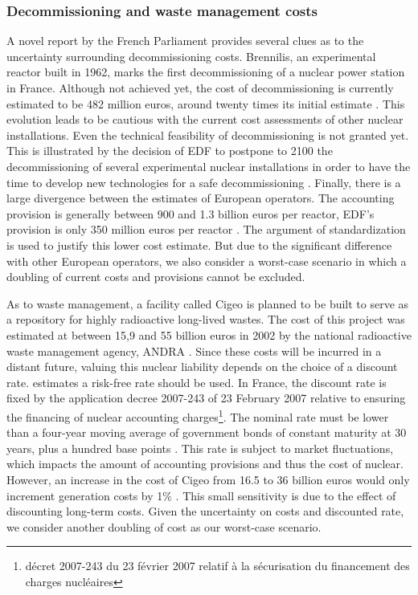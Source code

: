 \subsubsection{Decommissioning and waste management costs}

A novel report by the French Parliament provides several clues as to the uncertainty surrounding decommissioning costs. 
Brennilis, an experimental reactor built in 1962, marks the first decommissioning of a nuclear power station in France. Although not achieved yet, the cost of decommissioning is currently estimated to be 482 million euros, around twenty times its initial estimate \citep{AN2017}.
This evolution leads to be cautious with the current cost assessments of other nuclear installations.
Even the technical feasibility of decommissioning is not granted yet. This is illustrated by the decision of EDF to postpone to 2100 the decommissioning of several experimental nuclear installations in order to have the time to develop new technologies for a safe decommissioning \citep{AN2017}.
Finally, there is a large divergence between the estimates of European operators. The accounting provision is generally between 900 and 1.3 billion euros per reactor, EDF's provision is only 350 million euros per reactor \citep{AN2017}. The argument of standardization is used to justify this lower cost estimate.
But due to the significant difference with other European operators, we also consider a worst-case scenario in which a doubling of current costs and provisions cannot be excluded.

As to waste management, a facility called Cigeo is planned to be built to serve as a repository for highly radioactive long-lived wastes. The cost of this project was estimated at between 15,9 and 55 billion euros in 2002 by the national radioactive waste management agency, ANDRA \citep[p. 142]{CourdesComptes2012}.
Since these costs will be incurred in a distant future, valuing this nuclear liability depends on the choice of a discount rate. \citet{Taylor2008} estimates a risk-free rate should be used. 
In France, the discount rate is fixed by the application decree 2007-243 of 23 February 2007 relative to ensuring the financing of nuclear accounting charges\footnote{décret 2007-243 du 23 février 2007 relatif à la sécurisation du financement des charges nucléaires}. 
The nominal rate must be lower than a four-year moving average of government bonds of constant maturity at 30 years, plus a hundred base points \citep[p. 110]{CourdesComptes2014}. This rate is subject to market fluctuations, which impacts the amount of accounting provisions and thus the cost of nuclear.
However, an increase in the cost of Cigeo from 16.5 to 36 billion euros would only increment generation costs by 1\% \citep[p. 282]{CourdesComptes2012}. This small sensitivity is due to the effect of discounting long-term costs. Given the uncertainty on costs and discounted rate, we consider another doubling of cost as our worst-case scenario.


